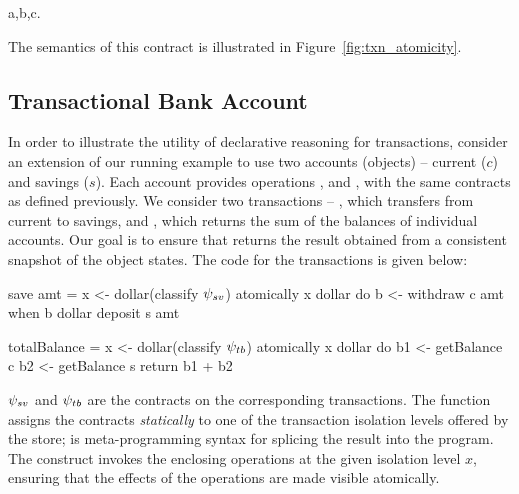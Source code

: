 \vspace{-1em}
\begin{smathpar}
\forall a,b,c.~ ~\wedge~  ~\wedge~ 
\Rightarrow {}
\end{smathpar}

\noindent The semantics of this contract is illustrated in
Figure~\ref{fig:txn_atomicity}.

\subsection{Transactional Bank Account}

In order to illustrate the utility of declarative reasoning for transactions,
consider an extension of our running example to use two accounts (objects) --
current ($c$) and savings ($s$). Each account provides operations
,  and , with the same contracts as
defined previously. We consider two transactions -- , which
transfers  from current to savings, and , which
returns the sum of the balances of individual accounts. Our goal is to ensure
that  returns the result obtained from a consistent snapshot
of the object states. The \name code for the transactions is given below:

\noindent \begin{minipage}[t]{0.53\columnwidth}
\begin{codehaskell}
save amt =
  x <- dollar(classify $\psi_{sv}$)
  atomically x dollar do
    b <- withdraw c amt
    when b dollar deposit s amt
\end{codehaskell}
\end{minipage}
\begin{minipage}[t]{0.47\columnwidth}
\begin{codehaskell}
totalBalance =
  x <- dollar(classify $\psi_{tb}$)
  atomically x dollar do
    b1 <- getBalance c
    b2 <- getBalance s
    return b1 + b2
\end{codehaskell}
\end{minipage}

$\psi_{sv}$ and $\psi_{tb}$ are the contracts on the corresponding
transactions. The function  assigns the contracts
\emph{statically} to one of the transaction isolation levels offered by the
store; \cf{\$()} is meta-programming syntax for splicing the result into the
program. The  construct invokes the enclosing operations at the
given isolation level $x$, ensuring that the effects of the operations are made
visible atomically.

